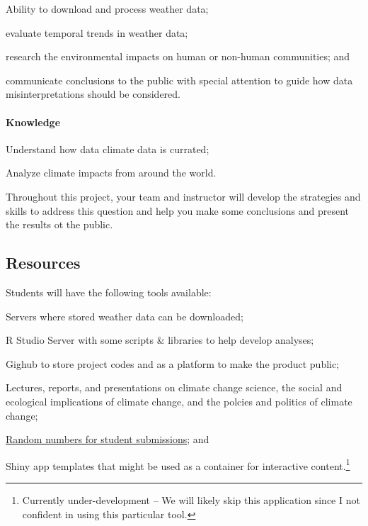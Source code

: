 \documentclass{article}\usepackage[]{graphicx}\usepackage[]{color}
\newenvironment{itemize*}%
  {\begin{itemize}%
    \setlength{\itemsep}{0pt}%
    \setlength{\parskip}{0pt}}%
  {\end{itemize}}
\begin{document}
\begin{itemize*}
  \item Ability to download and process weather data;
  \item evaluate temporal trends in weather data;
  \item research the environmental impacts on human or non-human communities; and
  \item communicate conclusions to the public with special attention to guide how data misinterpretations should be considered.
\end{itemize*}

\paragraph{Knowledge}
\begin{itemize*}
  \item Understand how data climate data is currated;
  \item Analyze climate impacts from around the world.
\end{itemize*}

Throughout this project, your team and instructor will develop the strategies and skills to address this question and help you make some conclusions and present the results ot the public.

\subsection{Resources}

Students will have the following tools available:

\begin{itemize*}
  \item Servers where stored weather data can be downloaded;
  \item R Studio Server with some scripts \& libraries to help develop analyses;
  \item Gighub to store project codes and as a platform to make the product public;
  \item Lectures, reports, and presentations on climate change science, the social and ecological implications of climate change, and the polcies and politics of climate change;
  \item \href{https://github.com/marclos/Climate_Change_Narratives/raw/master/Admin/RandomNumbers.pdf}{Random numbers for student submissions}; and
  \item Shiny app templates that might be used as a container for interactive content.\footnote{Currently under-development -- We will likely skip this application since I not confident in using this particular tool.}
\end{itemize*}
\end{document}
